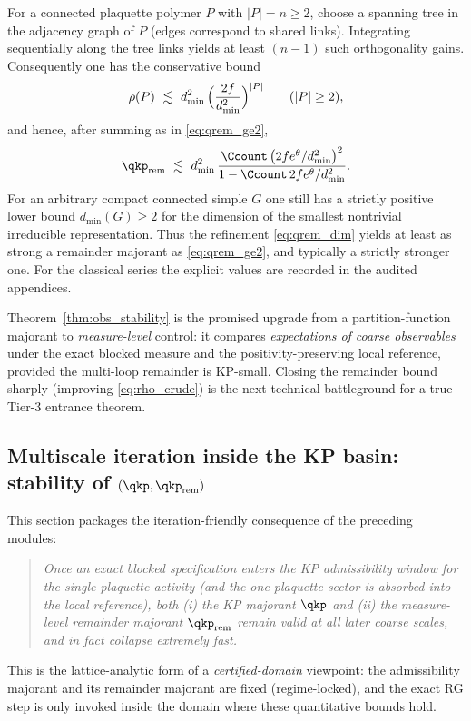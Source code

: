 For a connected plaquette polymer $P$ with $|P|=n\ge 2$, choose a spanning tree in the adjacency graph of $P$ (edges correspond to shared links).
Integrating sequentially along the tree links yields at least $(n-1)$ such orthogonality gains.
Consequently one has the conservative bound
\begin{equation}\label{eq:rho_dim_supp}
\rho(P)\ \lesssim\ d_{\min}^{2}\,\Bigl(\frac{2f}{d_{\min}^{2}}\Bigr)^{|P|}\qquad(|P|\ge 2),
\end{equation}
and hence, after summing as in \eqref{eq:qrem_ge2},
\begin{equation}\label{eq:qrem_dim}
\qkp_{\mathrm{rem}}
\ \lesssim\
d_{\min}^{2}\,
\frac{\Ccount\,\bigl(2f e^{\theta}/d_{\min}^{2}\bigr)^{2}}{1-\Ccount\,2f e^{\theta}/d_{\min}^{2}}.
\end{equation}
For an arbitrary compact connected simple $G$ one still has a strictly positive lower bound $d_{\min}(G)\ge 2$ for the dimension of the smallest nontrivial irreducible representation. Thus the refinement \eqref{eq:qrem_dim} yields at least as strong a remainder majorant as \eqref{eq:qrem_ge2}, and typically a strictly stronger one. For the classical series the explicit values are recorded in the audited appendices.



\begin{remark}[Interpretation]
Theorem~\ref{thm:obs_stability} is the promised upgrade from a partition-function majorant to \emph{measure-level} control: it compares \emph{expectations of coarse observables} under the exact blocked measure and the positivity-preserving local reference, provided the multi-loop remainder is KP-small.
Closing the remainder bound sharply (improving \eqref{eq:rho_crude}) is the next technical battleground for a true Tier-3 entrance theorem.
\end{remark}



\subsection{Multiscale iteration inside the KP basin: stability of \texorpdfstring{$(\qkp,\qkp_{\mathrm{rem}})$}{(q,q\_rem)}}
\label{sec:iteration}

This section packages the iteration-friendly consequence of the preceding modules:
\begin{quote}
\emph{Once an exact blocked specification enters the KP admissibility window for the single-plaquette activity (and the one-plaquette sector is absorbed into the local reference), both (i) the KP majorant $\qkp$ and (ii) the measure-level remainder majorant $\qkp_{\mathrm{rem}}$ remain valid at all later coarse scales, and in fact collapse extremely fast.}
\end{quote}
This is the lattice-analytic form of a \emph{certified-domain} viewpoint: the admissibility majorant and its remainder majorant are fixed (regime-locked), and the exact RG step is only invoked inside the domain where these quantitative bounds hold.

